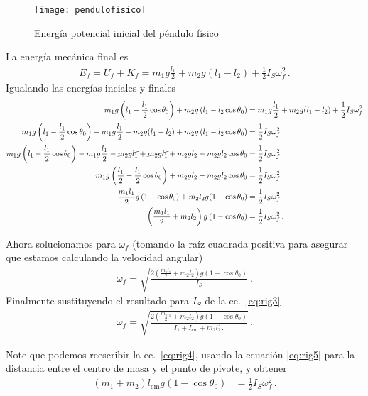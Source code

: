 \begin{itemize}
\begin{enumerate}
\begin{figure}
  \centering
  \texttt{[image: pendulofisico]}
  \caption{Energía potencial inicial del péndulo físico}
  \label{fig:pendulofisico}
\end{figure}

La energía mecánica final es
\begin{align}
  E_f=U_f+K_f=m_1 g \frac{l_1}{2}+m_2 g(l_1-l_2)+\frac{1}{2}I_S \omega_f^2\,.
\end{align}
Igualando las energías inciales y finales
\begin{align}
\label{eq:rig4}
  m_1 g  \left(l_1-\frac{l_1}{2}\cos\theta_0  \right)
+m_2 g  \left(l_1-l_2\cos\theta_0  \right)&=m_1 g \frac{l_1}{2}+m_2 g(l_1-l_2)+\frac{1}{2}I_S \omega_f^2\nonumber\\
  m_1 g  \left(l_1-\frac{l_1}{2}\cos\theta_0  \right)-m_1 g \frac{l_1}{2}-m_2 g(l_1-l_2)
+m_2 g  \left(l_1-l_2\cos\theta_0  \right)&=\frac{1}{2}I_S \omega_f^2\nonumber\\
  m_1 g  \left(l_1-\frac{l_1}{2}\cos\theta_0  \right)-m_1 g \frac{l_1}{2}-\cancel{m_2 g l_1}+\cancel{m_2 gl_1}+m_2 gl_2
-m_2 g  l_2\cos\theta_0 &=\frac{1}{2}I_S \omega_f^2\nonumber\\
  m_1 g  \left(\frac{l_1}{2}-\frac{l_1}{2}\cos\theta_0  \right)+m_2 gl_2
-m_2 g  l_2\cos\theta_0 &=\frac{1}{2}I_S \omega_f^2\nonumber\\
  \frac{m_1 l_1}{2}g \left(1-\cos\theta_0  \right)+
m_2 l_2 g(1-\cos\theta_0) &=\frac{1}{2}I_S \omega_f^2\nonumber\\
  \left(\frac{m_1 l_1}{2}+ m_2 l_2 \right)g \left(1-\cos\theta_0  \right) &=\frac{1}{2}I_S \omega_f^2\,.
\end{align}

Ahora solucionamos para $\omega_f$ (tomando la raíz cuadrada positiva para asegurar que estamos calculando la velocidad angular)
\begin{align}
  \omega_f=\sqrt{\frac{2\left(\frac{m_1 l_1}{2}+ m_2 l_2 \right)g \left(1-\cos\theta_0  \right)}{I_S}}\,.
\end{align}
Finalmente sustituyendo el resultado para $I_S$ de la ec.~\eqref{eq:rig3}
\begin{align}
    \omega_f=\sqrt{\frac{2\left(\frac{m_1 l_1}{2}+ m_2 l_2 \right)g \left(1-\cos\theta_0  \right)}{I_1+I_{\text{cm}}+m_2 l_2^2\,.}}\,.
\end{align}
  \end{enumerate}

Note que podemos reescribir la ec.~\eqref{eq:rig4}, usando la ecuación \eqref{eq:rig5} para la distancia entre el centro de masa y el punto de pivote, y obtener
\begin{align}
\label{eq:rig6}
 (m_1+m_2)l_{\text{cm}} g \left(1-\cos\theta_0  \right) &=\frac{1}{2}I_S \omega_f^2\,. 
\end{align}


\end{itemize}
